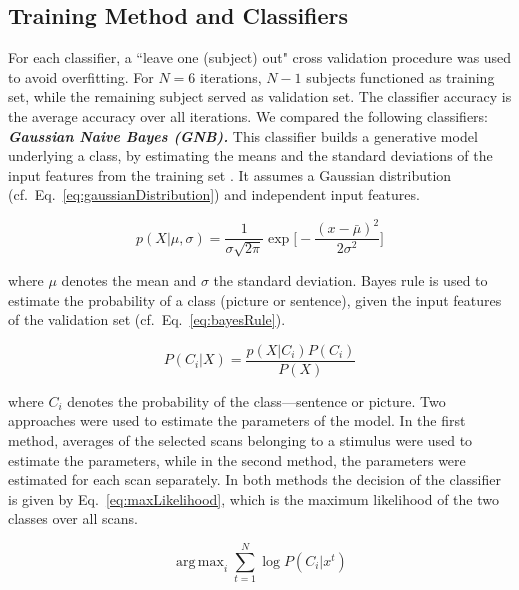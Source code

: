 \documentclass[preprint,journal,11pt]{vgtc}
\begin{document}
\subsection{Training Method and Classifiers}
\label{sec:trainingMethodsAndClassifiers}

For each classifier, a ``leave one (subject) out" cross validation procedure was used to avoid overfitting. For $N=6$ iterations, $N-1$ subjects functioned as training set, while the remaining subject served as validation set. The classifier accuracy is the average accuracy over all iterations. 
We compared the following classifiers:\\

\textbf{\emph{Gaussian Naive Bayes (GNB).}} This classifier builds a generative model underlying a class, by estimating the means and the standard deviations of the input features from the training set \cite{bk:2004aplay}. It assumes a Gaussian distribution (cf.~Eq.~\ref{eq:gaussianDistribution}) and independent input features.

\begin{equation}
\label{eq:gaussianDistribution}
p(X|\mu, \sigma) = \frac{1}{\sigma\sqrt{2\pi}}\exp\Big[-\frac{(x - \bar{\mu})^2}{2\sigma^2}\Big]
\end{equation}

where $\mu$ denotes the mean and $\sigma$ the standard deviation. Bayes rule is used to estimate the probability of a class (picture or sentence), given the input features of the validation set (cf.~Eq.~\ref{eq:bayesRule}).

\begin{equation}
\label{eq:bayesRule}
P(C_{i}|X) = \frac{p(X|C_{i})P(C_{i})}{P(X)}
\end{equation}

where $C_i$ denotes the probability of the class---sentence or picture. Two approaches were used to estimate the parameters of the model. In the first method, averages of the selected scans belonging to a stimulus were used to estimate the parameters, while in the second method, the parameters were estimated for each scan separately. In both methods the decision of the classifier is given by Eq.~\ref{eq:maxLikelihood}, which is the maximum likelihood of the two classes over all scans.

\begin{equation}
\label{eq:maxLikelihood}
\operatorname{arg\,max}_i \sum_{t=1}^{N}{\log{P(C_{i}|x^{t})}}
\end{equation}
\end{document}

